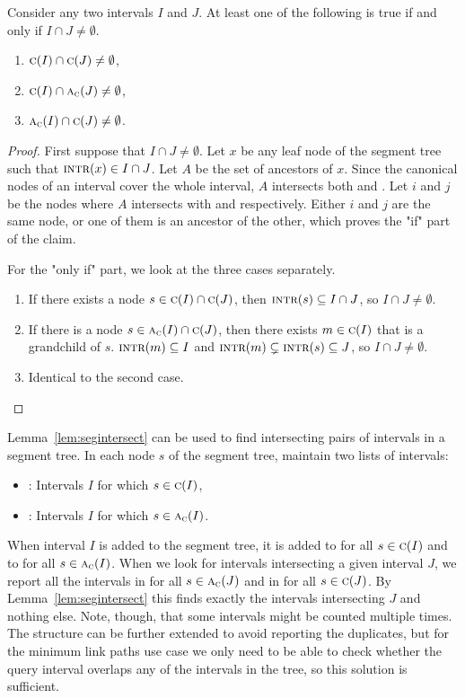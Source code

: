 \documentclass[english,gradu]{tktltiki2018}
\begin{document}
\begin{lem}\label{lem:segintersect}Consider any two intervals $I$ and $J$.
At least one of the following is true if and only if $I\cap J\neq\emptyset$.
\begin{enumerate}
\item $\textsc{c}(I)\cap\textsc{c}(J)\neq\emptyset$,
\item $\textsc{c}(I)\cap\textsc{a}_{\textsc{c}}(J)\neq\emptyset$,
\item $\textsc{a}_{\textsc{c}}(I)\cap\textsc{c}(J)\neq\emptyset$.
\end{enumerate}
\end{lem}
\begin{proof}
First suppose that $I\cap J\neq\emptyset$.
Let $x$ be any leaf node of the segment tree such that $\textsc{intr}(x)\in I\cap J$.
Let $A$ be the set of ancestors of $x$.
Since the canonical nodes of an interval cover the whole interval, $A$ intersects both  and .
Let $i$ and $j$ be the nodes where $A$ intersects with  and  respectively.
Either $i$ and $j$ are the same node, or one of them is an ancestor of the other, which proves the "if" part of the claim.

For the "only if" part, we look at the three cases separately.
\begin{enumerate}
\item If there exists a node $s\in\textsc{c}(I)\cap\textsc{c}(J)$, then $\textsc{intr}(s)\subseteq I\cap J$, so $I\cap J\neq\emptyset$.
\item If there is a node $s\in\textsc{a}_{\textsc{c}}(I)\cap\textsc{c}(J)$, then there exists $m\in\textsc{c}(I)$ that is a grandchild of $s$. $\textsc{intr}(m)\subseteq I$ and $\textsc{intr}(m)\subsetneq\textsc{intr}(s)\subseteq J$, so $I\cap J\neq\emptyset$.
\item Identical to the second case.
\end{enumerate}
\end{proof}

Lemma~\ref{lem:segintersect} can be used to find intersecting pairs of intervals in a segment tree.
In each node $s$ of the segment tree, maintain two lists of intervals:
\begin{itemize}
\item {}: Intervals $I$ for which $s\in\textsc{c}(I)$,
\item {}: Intervals $I$ for which $s\in\textsc{a}_{\textsc{c}}(I)$.
\end{itemize}
When interval $I$ is added to the segment tree, it is added to  for all $s\in\textsc{c}(I)$ and to  for all $s\in\textsc{a}_{\textsc{c}}(I)$.
When we look for intervals intersecting a given interval $J$, we report all the intervals in  for all $s\in\textsc{a}_{\textsc{c}}(J)$ and in  for all $s\in\textsc{c}(J)$.
By Lemma~\ref{lem:segintersect} this finds exactly the intervals intersecting $J$ and nothing else.
Note, though, that some intervals might be counted multiple times.
The structure can be further extended to avoid reporting the duplicates, but for the minimum link paths use case we only need to be able to check whether the query interval overlaps any of the intervals in the tree, so this solution is sufficient.
\end{document}
